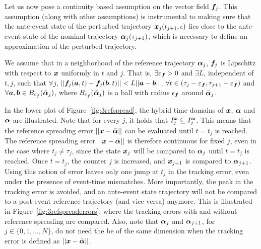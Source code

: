 \documentclass[../DC2017114Bouma.tex]{subfiles}
\begin{document}
Let us now pose a continuity based assumption on the vector field ${\boldsymbol{f}}_j$. This assumption (along with other assumptions) is instrumental to making sure that the ante-event state of the perturbed trajectory ${\boldsymbol{x}}_j(t_{j+1},\epsilon)$ lies close to the ante-event state of the nominal trajectory $\boldsymbol{\alpha}_j(\tau_{j+1})$, which is necessary to define an approximation of the perturbed trajectory.

\begin{sloppypar}
\begin{myass}\label{ass:lipschitz}
We assume that in a neighborhood of the reference trajectory $\boldsymbol{\alpha}_j$, ${\boldsymbol{f}}_j$ is Lipschitz with respect to ${\boldsymbol{x}}$ uniformly in $t$ and $j$. That is, $\exists\varepsilon_{{\boldsymbol{f}}}>0$ and $\exists L$, independent of $t,j$, such that $\forall j$, $||{\boldsymbol{f}}_j({\boldsymbol{a}},t) - {\boldsymbol{f}}_j({\boldsymbol{b}},t)||<L||{\boldsymbol{a}}-{\boldsymbol{b}}||$, $\forall t\in (\tau_j - \varepsilon_{{\boldsymbol{f}}},\tau_{j+1} + \varepsilon_{{\boldsymbol{f}}})$ and $\forall {\boldsymbol{a}},{\boldsymbol{b}}\in B_{\varepsilon_{{\boldsymbol{f}}}}(\bar{\boldsymbol{\alpha}}_j)$, where $B_{\varepsilon_{{\boldsymbol{f}}}}(\bar{\boldsymbol{\alpha}}_j)$ is a ball with radius $\epsilon_{{\boldsymbol{f}}}$ around $\bar{\boldsymbol{\alpha}}_j$.
\end{myass}
\end{sloppypar}

In the lower plot of Figure~\ref{fig:3refspread}, the hybrid time domains of ${\boldsymbol{x}}$, $\boldsymbol{\alpha}$ and $\bar{\boldsymbol{\alpha}}$ are illustrated. Note that for every $j$, it holds that $I^{{\boldsymbol{x}}}_j\subseteq I^{\bar{\boldsymbol{\alpha}}}_j$. This means that the reference spreading error $||{\boldsymbol{x}}-\bar{\boldsymbol{\alpha}}||$ can be evaluated until $t=t_j$ is reached. The reference spreading error $||{\boldsymbol{x}}-\bar{\boldsymbol{\alpha}}||$ is therefore continuous for fixed $j$, even in the case where $t_j\neq\tau_j$, since the state ${\boldsymbol{x}}_j$ will be compared to $\boldsymbol{\alpha}_j$ until $t=t_j$ is reached. Once $t=t_j$, the counter $j$ is increased, and ${\boldsymbol{x}}_{j+1}$ is compared to $\boldsymbol{\alpha}_{j+1}$. Using this notion of error leaves only one jump at $t_j$ in the tracking error, even under the presence of event-time mismatches. More importantly, the peak in the tracking error is avoided, and an ante-event state trajectory will not be compared to a post-event reference trajectory (and vice versa) anymore. This is illustrated in Figure~\ref{fig:3refspreaderrors}, where the tracking errors with and without reference spreading are compared. Also, note that $\boldsymbol{\alpha}_j$ and $\boldsymbol{\alpha}_{j+1}$, for $j\in\{0,1,\dots,N\}$, do not need the be of the same dimension when the tracking error is defined as $||{\boldsymbol{x}}-\bar{\boldsymbol{\alpha}}||$.
\end{document}
